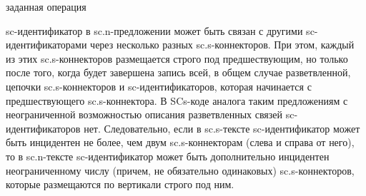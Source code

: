 \begin{SCn}
\begin{scnstruct}
\begin{scnrelfromlist}{заданная операция}
\begin{scnindent}
{\begin{scnitemize}
                        \item sc-идентификатор в sc.n-предложении может быть связан с другими sc-идентификаторами через несколько разных sc.s-коннекторов. При этом, каждый из этих sc.s-коннекторов размещается строго под предшествующим, но только после того, когда будет завершена запись всей, в общем случае разветвленной, цепочки sc.s-коннекторов и sc-идентификаторов, которая начинается с предшествующего sc.s-коннектора. В SCs-коде аналога таким предложениям с неограниченной возможностью описания разветвленных связей sc-идентификаторов нет. Следовательно, если в sc.s-тексте sc-идентификатор может быть инцидентен не более, чем двум sc.s-коннекторам (слева и справа от него), то в sc.n-тексте sc-идентификатор может быть дополнительно инцидентен неограниченному числу (причем, не обязательно одинаковых) sc.s-коннекторов, которые размещаются по вертикали строго под ним.
                    \end{scnitemize}
                }
            \end{scnindent}
            \begin{scnindent}
            \end{scnindent}
        \end{scnrelfromlist}
        

\end{scnstruct}
\end{SCn}
